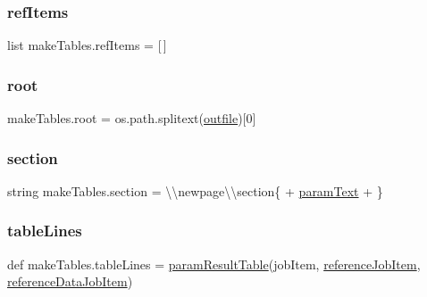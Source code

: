 \subsubsection{\texorpdfstring{ref\+Items}{refItems}}
{\footnotesize\ttfamily list make\+Tables.\+ref\+Items = \mbox{[}$\,$\mbox{]}}

\mbox{\label{namespacemakeTables_a179f7e6a13b197ab0b1a120ee7d3a36a}} 
\subsubsection{\texorpdfstring{root}{root}}
{\footnotesize\ttfamily make\+Tables.\+root = os.\+path.\+splitext(\mbox{\hyperlink{namespacemakeTables_a5b2a60e5426f013550a0491f01657fdb}{outfile}})\mbox{[}0\mbox{]}}

\mbox{\label{namespacemakeTables_a7da11f1c70714c321f800cb70031c2ed}} 
\subsubsection{\texorpdfstring{section}{section}}
{\footnotesize\ttfamily string make\+Tables.\+section = \textquotesingle{}\textbackslash{}\textbackslash{}newpage\textbackslash{}\textbackslash{}section\{ \textquotesingle{} + \mbox{\hyperlink{namespacemakeTables_acb89b46fcf39a44e9dc7ebe922f81f0e}{param\+Text}} + \textquotesingle{}\}\textquotesingle{}}

\mbox{\label{namespacemakeTables_a0759ca842c69d98c6d9e341685e8bf53}} 
\subsubsection{\texorpdfstring{table\+Lines}{tableLines}}
{\footnotesize\ttfamily def make\+Tables.\+table\+Lines = \mbox{\hyperlink{namespacemakeTables_a05676f114347275725afdc58dc3656ff}{param\+Result\+Table}}(job\+Item, \mbox{\hyperlink{namespacemakeTables_a1cae4337555e5967aef37fdffadd4dc4}{reference\+Job\+Item}}, \mbox{\hyperlink{namespacemakeTables_ad2d53b08380c10346fc6ff9a0e12942b}{reference\+Data\+Job\+Item}})}

